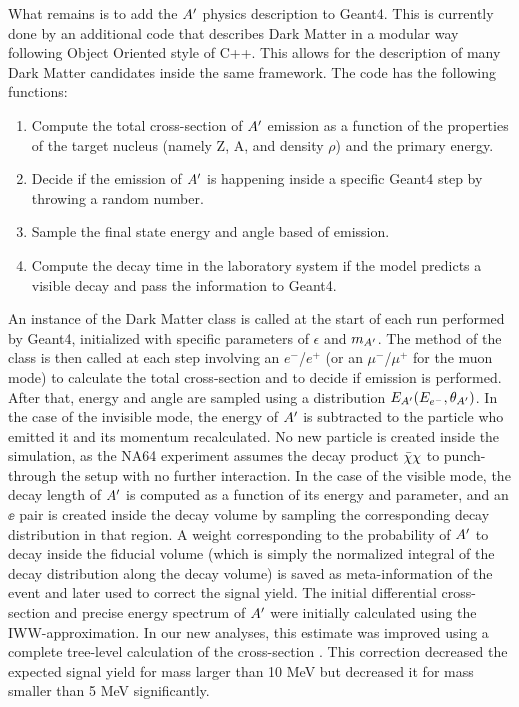 What remains is to add the $A'$ physics description to Geant4. This is currently done by an additional code that describes Dark Matter in a modular way following Object Oriented style of C++. This allows for the description of many Dark Matter candidates inside the same framework. The code has the following functions:

\begin{enumerate}
\item Compute the total cross-section of $A'$ emission as a function of the properties of the target nucleus (namely Z, A, and density $\rho$) and the primary energy.
\item Decide if the emission of $A'$ is happening inside a specific Geant4 step by throwing a random number.
\item Sample the final state energy and angle based of emission.
\item Compute the decay time in the laboratory system if the model predicts a visible decay and pass the information to Geant4.
\end{enumerate}

An instance of the Dark Matter class is called at the start of each run performed by Geant4, initialized with specific parameters of $\epsilon$ and $m_{A'}$. The method of the class is then called at each step involving an $e^-$/$e^+$ (or an $\mu^-$/$\mu^+$ for the muon mode) to calculate the total cross-section and to decide if emission is performed. After that, energy and angle are sampled using a distribution $E_{A'}(E_{e^-}, \theta_{A'})$. In the case of the invisible mode, the energy of $A'$ is subtracted to the particle who emitted it and its momentum recalculated. No new particle is created inside the simulation, as the NA64 experiment assumes the decay product $\bar{\chi} \chi$ to punch-through the setup with no further interaction. In the case of the visible mode, the decay length of $A'$ is computed as a function of its energy and parameter, and an $\ee$ pair is created inside the decay volume by sampling the corresponding decay distribution in that region. A weight corresponding to the probability of $A'$ to decay inside the fiducial volume (which is simply the normalized integral of the decay distribution along the decay volume) is saved as meta-information of the event and later used to correct the signal yield.
The initial differential cross-section and precise energy spectrum of $A'$ were initially calculated using the IWW-approximation. In our new analyses, this estimate was improved using a complete tree-level calculation of the cross-section \cite{DMsimulation}. This correction decreased the expected signal yield for mass larger than 10 MeV but decreased it for mass smaller than 5 MeV significantly.

